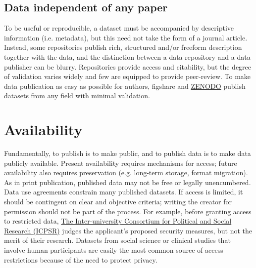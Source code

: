 \documentclass[10pt,twocolumn]{article}
\begin{document}
\subsection*{Data independent of any paper}\label{paper-independent-data}

To be useful or reproducible, a dataset must be accompanied by descriptive information (i.e. metadata)\cite{gray_online_2002}, but this need not take the form of a journal article.
Instead, some repositories publish rich, structured and/or freeform description together with the data, and the distinction between a data repository and a data publisher can be blurry.
Repositories provide access and citability, but the degree of validation varies widely and few are equipped to provide peer-review.
To make data publication as easy as possible for authors, figshare and \href{https://zenodo.org/}{ZENODO} publish datasets from any field with minimal validation.

\section*{Availability}\label{availability}

Fundamentally, to publish is to make public, and to publish data is to make data publicly available.
Present availability requires mechanisms for access; future availability also requires preservation (e.g. long-term storage, format migration)\cite{waters_preserving_1996, beagrie_digital_2008, gray_online_2002}.
As in print publication, published data may not be free or legally unencumbered.
Data use agreements constrain many published datasets.
If access is limited, it should be contingent on clear and objective criteria; writing the creator for permission should not be part of the process.
For example, before granting access to restricted data, \href{http://www.icpsr.umich.edu/icpsrweb/content/deposit/confidentiality.html}{The Inter-university Consortium for Political and Social Research (ICPSR)} judges the applicant's proposed security measures, but not the merit of their research.
Datasets from social science or clinical studies that involve human participants are easily the most common source of access restrictions because of the need to protect privacy.
\end{document}

